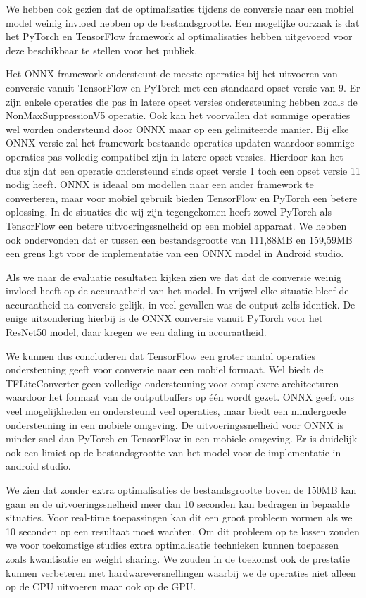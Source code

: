 We hebben ook gezien dat de optimalisaties tijdens de conversie naar een mobiel model weinig invloed hebben op de bestandsgrootte.
Een mogelijke oorzaak is dat het PyTorch en TensorFlow framework al optimalisaties hebben uitgevoerd voor deze beschikbaar te stellen voor het publiek.

Het ONNX framework ondersteunt de meeste operaties bij het uitvoeren van conversie vanuit TensorFlow en PyTorch met een standaard opset versie van 9.
Er zijn enkele operaties die pas in latere opset versies ondersteuning hebben zoals de NonMaxSuppressionV5 operatie.
Ook kan het voorvallen dat sommige operaties wel worden ondersteund door ONNX maar op een gelimiteerde manier.
Bij elke ONNX versie zal het framework bestaande operaties updaten waardoor sommige operaties pas volledig compatibel zijn in latere opset versies.
Hierdoor kan het dus zijn dat een operatie ondersteund sinds opset versie 1 toch een opset versie 11 nodig heeft.
ONNX is ideaal om modellen naar een ander framework te converteren, maar voor mobiel gebruik bieden TensorFlow en PyTorch een betere oplossing.
In de situaties die wij zijn tegengekomen heeft zowel PyTorch als TensorFlow een betere uitvoeringssnelheid op een mobiel apparaat.
We hebben ook ondervonden dat er tussen een bestandsgrootte van 111,88MB en 159,59MB een grens ligt voor de implementatie van een ONNX model in Android studio.

Als we naar de evaluatie resultaten kijken zien we dat dat de conversie weinig invloed heeft op de accuraatheid van het model.
In vrijwel elke situatie bleef de accuraatheid na conversie gelijk, in veel gevallen was de output zelfs identiek.
De enige uitzondering hierbij is de ONNX conversie vanuit PyTorch voor het ResNet50 model, daar kregen we een daling in accuraatheid.

We kunnen dus concluderen dat TensorFlow een groter aantal operaties ondersteuning geeft voor conversie naar een mobiel formaat.
Wel biedt de TFLiteConverter geen volledige ondersteuning voor complexere architecturen waardoor het formaat van de outputbuffers op \'e\'en wordt gezet.
ONNX geeft ons veel mogelijkheden en ondersteund veel operaties, maar biedt een mindergoede ondersteuning in een mobiele omgeving.
De uitvoeringssnelheid voor ONNX is minder snel dan PyTorch en TensorFlow in een mobiele omgeving.
Er is duidelijk ook een limiet op de bestandsgrootte van het model voor de implementatie in android studio.

We zien dat zonder extra optimalisaties de bestandsgrootte boven de 150MB kan gaan en de uitvoeringssnelheid meer dan 10 seconden kan bedragen in bepaalde situaties.
Voor real-time toepassingen kan dit een groot probleem vormen als we 10 seconden op een resultaat moet wachten.
Om dit probleem op te lossen zouden we voor toekomstige studies extra optimalisatie technieken kunnen toepassen zoals kwantisatie en weight sharing.
We zouden in de toekomst ook de prestatie kunnen verbeteren met hardwareversnellingen waarbij we de operaties niet alleen op de CPU uitvoeren maar ook op de GPU. 